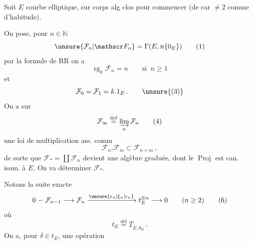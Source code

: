 Soit $E$ courbe elliptique, sur corps alg clos  pour commencer (de car $\ne2$ comme d'habitude).

On pose, pour $n\in\mathbb N$
\[
\unsure{\mathcal F_n|\mathscr F_n}=\Gamma(E,n\{0_E\}) \tag*{(1)}
\]
par la formule de RR on a
\[
\operatorname{rg}_k\mathcal F_n=n\qquad\text{si }\ n\geq1 \tag*{(2)}
\]
et
\[
\mathcal F_0=\mathcal F_1=k.1_E\,. \tag*{\unsure{(3)}}
\]
On a  sur
\[
\mathcal F_\infty\overset{\mathrm{def}}{=}\varinjlim_n\mathcal F_n \tag*{(4)}
\]
une loi de multiplication ass. comm
\[
\mathcal F_n.\mathcal F_m\subset\mathcal F_{n+m}\,, \tag*{(5)}
\]
de sorte que $\mathcal F_*=\coprod\mathcal F_n$ devient une algèbre graduée, dont le $\operatorname{Proj}$ est can. isom. à $E$. On va déterminer $\mathcal F_*$.

Notons la suite exacte
\[
0\mathrel{-}\mathcal F_{n-1}\longrightarrow\mathcal F_n
\xrightarrow{\unsure{\varepsilon_n|\xi_n|\epsilon_n}}t_E^{\otimes n}\longrightarrow0\qquad(n\geq2) \tag*{(6)}
\]
où
\[
t_E\overset{\text{déf}}{=}\underline T_{E,0_E}\,. \tag*{(7)}
\]
On a, pour $\delta\in t_E$, une opération
